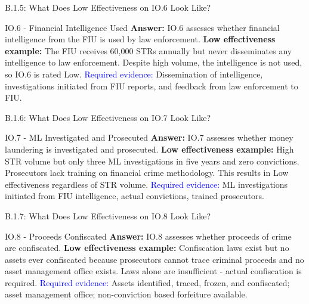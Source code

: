 \documentclass{beamer}
\begin{document}
	\begin{frame}{B.1.5: What Does Low Effectiveness on IO.6 Look Like?}
		\begin{block}{IO.6 - Financial Intelligence Used}
			\textbf{Answer:} IO.6 assesses whether financial intelligence from the FIU is used by law enforcement.
			\vspace{0.2cm}
			\textbf{Low effectiveness example:} The FIU receives 60,000 STRs annually but never disseminates any intelligence to law enforcement. Despite high volume, the intelligence is not used, so IO.6 is rated Low.
			\vspace{0.2cm}
			\textcolor{blue}{Required evidence:} Dissemination of intelligence, investigations initiated from FIU reports, and feedback from law enforcement to FIU.
		\end{block}
	\end{frame}
	
	\begin{frame}{B.1.6: What Does Low Effectiveness on IO.7 Look Like?}
		\begin{block}{IO.7 - ML Investigated and Prosecuted}
			\textbf{Answer:} IO.7 assesses whether money laundering is investigated and prosecuted.
			\vspace{0.2cm}
			\textbf{Low effectiveness example:} High STR volume but only three ML investigations in five years and zero convictions. Prosecutors lack training on financial crime methodology. This results in Low effectiveness regardless of STR volume.
			\vspace{0.2cm}
			\textcolor{blue}{Required evidence:} ML investigations initiated from FIU intelligence, actual convictions, trained prosecutors.
		\end{block}
	\end{frame}
	
	\begin{frame}{B.1.7: What Does Low Effectiveness on IO.8 Look Like?}
		\begin{block}{IO.8 - Proceeds Confiscated}
			\textbf{Answer:} IO.8 assesses whether proceeds of crime are confiscated.
			\vspace{0.2cm}
			\textbf{Low effectiveness example:} Confiscation laws exist but no assets ever confiscated because prosecutors cannot trace criminal proceeds and no asset management office exists. Laws alone are insufficient - actual confiscation is required.
			\vspace{0.2cm}
			\textcolor{blue}{Required evidence:} Assets identified, traced, frozen, and confiscated; asset management office; non-conviction based forfeiture available.
		\end{block}
	\end{frame}
	
\end{document}
